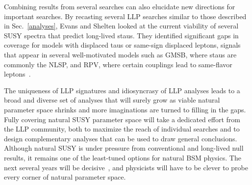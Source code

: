 \documentclass[12pt]{article}
\begin{document}
    Combining results from several searches can also elucidate new directions for important searches. By recasting several LLP searches similar to those described in Sec.~\ref{analyses}, Evans and Shelten looked at the current viability of several SUSY spectra that predict long-lived staus. They identified significant gaps in coverage for models with displaced taus or same-sign displaced leptons, signals that appear in several well-motivated models such as GMSB, where staus are commonly the NLSP, and RPV, where certain couplings lead to same-flavor leptons~\cite{ll_staus}. 

    The uniqueness of LLP signatures and idiosyncrasy of LLP analyses leads to a broad and diverse set of analyses that will surely grow as viable natural parameter space shrinks and more imaginations are turned to filling in the gaps. Fully covering natural SUSY parameter space will take a dedicated effort from the LLP community, both to maximize the reach of individual searches and to design complementary analyses that can be used to draw general conclusions. Although natural SUSY is under pressure from conventional and long-lived null results, it remains one of the least-tuned options for natural BSM physics. The next several years will be decisive~\cite{cornering}, and physicists will have to be clever to probe every corner of natural parameter space.

\clearpage
\pagebreak
\singlespacing
{}

\end{document}
